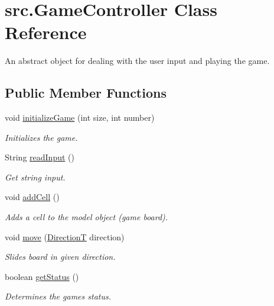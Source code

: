 \hypertarget{classsrc_1_1GameController}{}\section{src.\+Game\+Controller Class Reference}
\label{classsrc_1_1GameController}


An abstract object for dealing with the user input and playing the game.  


\subsection*{Public Member Functions}
\begin{DoxyCompactItemize}
\item 
void \hyperlink{classsrc_1_1GameController_a08f904aaa7bd33a394efa613f1381f34}{initialize\+Game} (int size, int number)
\begin{DoxyCompactList}\small\item\em Initializes the game. \end{DoxyCompactList}\item 
String \hyperlink{classsrc_1_1GameController_a20d10d112b3e30132c8b8594f2ceb6dd}{read\+Input} ()
\begin{DoxyCompactList}\small\item\em Get string input. \end{DoxyCompactList}\item 
\mbox{\label{classsrc_1_1GameController_a149a141092c49bf3b247302a67f2841e}} 
void \hyperlink{classsrc_1_1GameController_a149a141092c49bf3b247302a67f2841e}{add\+Cell} ()
\begin{DoxyCompactList}\small\item\em Adds a cell to the model object (game board). \end{DoxyCompactList}\item 
void \hyperlink{classsrc_1_1GameController_a077ce144db0723f692c64245fb0afbab}{move} (\hyperlink{enumsrc_1_1DirectionT}{DirectionT} direction)
\begin{DoxyCompactList}\small\item\em Slides board in given direction. \end{DoxyCompactList}\item 
boolean \hyperlink{classsrc_1_1GameController_adc7871ab4e7d684ff7c2f81e60b5eef0}{get\+Status} ()
\begin{DoxyCompactList}\small\item\em Determines the game\textquotesingle{}s status. \end{DoxyCompactList}\item 

\end{DoxyCompactItemize}
